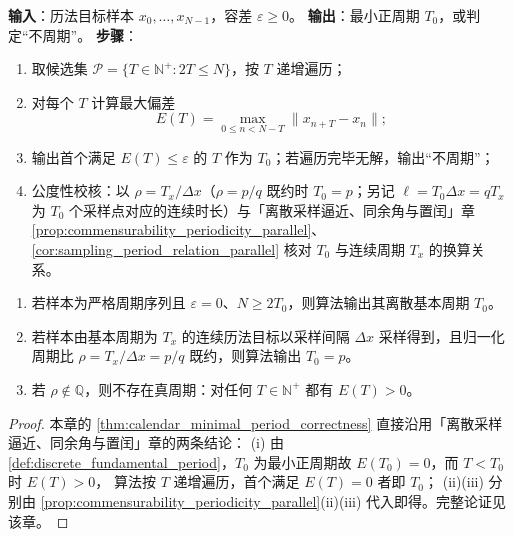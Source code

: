 \begin{definition}[历法最小正周期算法]\label{def:calendar_minimal_period_algorithm}
\textbf{输入}：历法目标样本 \(x_0,\dots,x_{N-1}\)，容差 \(\varepsilon\ge0\)。
\textbf{输出}：最小正周期 \(T_0\)，或判定“不周期”。
\textbf{步骤}：
\begin{enumerate}[label=(\arabic*)]
    \item 取候选集 \(\mathcal P=\{T\in\mathbb N^+:2T\le N\}\)，按 \(T\) 递增遍历；
    \item 对每个 \(T\) 计算最大偏差
    \[
    E(T)=\max_{0\le n<N-T}\|x_{n+T}-x_n\|;
    \]
    \item 输出首个满足 \(E(T)\le\varepsilon\) 的 \(T\) 作为 \(T_0\)；若遍历完毕无解，输出“不周期”；
    \item 公度性校核：以 \(\rho=T_x/\Delta x\)（\(\rho=p/q\) 既约时 \(T_0=p\)；另记 \(\ell=T_0\Delta x=qT_x\) 为 \(T_0\) 个采样点对应的连续时长）与「离散采样逼近、同余角与置闰」章 \cref{prop:commensurability_periodicity_parallel}、\cref{cor:sampling_period_relation_parallel} 核对 \(T_0\) 与连续周期 \(T_x\) 的换算关系。
\end{enumerate}
\end{definition}

\begin{theorem}[历法最小正周期算法的正确性]\label{thm:calendar_minimal_period_correctness}
\begin{enumerate}[label=(\roman*)]
    \item 若样本为严格周期序列且 \(\varepsilon=0\)、\(N\ge2T_0\)，则算法输出其离散基本周期 \(T_0\)。
    \item 若样本由基本周期为 \(T_x\) 的连续历法目标以采样间隔 \(\Delta x\) 采样得到，且归一化周期比 \(\rho=T_x/\Delta x=p/q\) 既约，则算法输出 \(T_0=p\)。
    \item 若 \(\rho\notin\mathbb Q\)，则不存在真周期：对任何 \(T\in\mathbb N^+\) 都有 \(E(T)>0\)。
\end{enumerate}
\end{theorem}

\begin{proof}
本章的 \cref{thm:calendar_minimal_period_correctness} 直接沿用「离散采样逼近、同余角与置闰」章的两条结论：
(i) 由 \cref{def:discrete_fundamental_period}，$T_0$ 为最小正周期故 $E(T_0)=0$，而 $T<T_0$ 时 $E(T)>0$，
算法按 $T$ 递增遍历，首个满足 $E(T)=0$ 者即 $T_0$；
(ii)(iii) 分别由 \cref{prop:commensurability_periodicity_parallel}(ii)(iii) 代入即得。完整论证见该章。
\end{proof}

